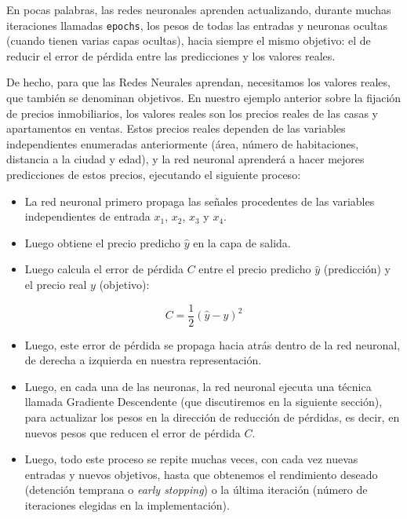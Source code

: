 \documentclass[
]{book}
\providecommand{\tightlist}{%
  \setlength{\itemsep}{0pt}\setlength{\parskip}{0pt}}
\begin{document}
En pocas palabras, las redes neuronales aprenden actualizando, durante muchas iteraciones llamadas \texttt{epochs}, los pesos de todas las entradas y neuronas ocultas (cuando tienen varias capas ocultas), hacia siempre el mismo objetivo: el de reducir el error de pérdida entre las predicciones y los valores reales.

De hecho, para que las Redes Neurales aprendan, necesitamos los valores reales, que también se denominan objetivos. En nuestro ejemplo anterior sobre la fijación de precios inmobiliarios, los valores reales son los precios reales de las casas y apartamentos en ventas. Estos precios reales dependen de las variables independientes enumeradas anteriormente (área, número de habitaciones, distancia a la ciudad y edad), y la red neuronal aprenderá a hacer mejores predicciones de estos precios, ejecutando el siguiente proceso:

\begin{itemize}
\tightlist
\item
  La red neuronal primero propaga las señales procedentes de las variables independientes de entrada \(x_1\), \(x_2\), \(x_3\) y \(x_4\).
\item
  Luego obtiene el precio predicho \(\hat{y}\) en la capa de salida.\\
\item
  Luego calcula el error de pérdida \(C\) entre el precio predicho \(\hat{y}\) (predicción) y el precio real \(y\) (objetivo):
\end{itemize}

\[C = \frac{1}{2} (\hat{y} - y)^2\]

\begin{itemize}
\tightlist
\item
  Luego, este error de pérdida se propaga hacia atrás dentro de la red neuronal, de derecha a izquierda en nuestra representación.\\
\item
  Luego, en cada una de las neuronas, la red neuronal ejecuta una técnica llamada Gradiente Descendente (que discutiremos en la siguiente sección), para actualizar los pesos en la dirección de reducción de pérdidas, es decir, en nuevos pesos que reducen el error de pérdida \(C\).\\
\item
  Luego, todo este proceso se repite muchas veces, con cada vez nuevas entradas y nuevos objetivos, hasta que obtenemos el rendimiento deseado (detención temprana o \emph{early stopping}) o la última iteración (número de iteraciones elegidas en la implementación).
\end{itemize}
\end{document}
